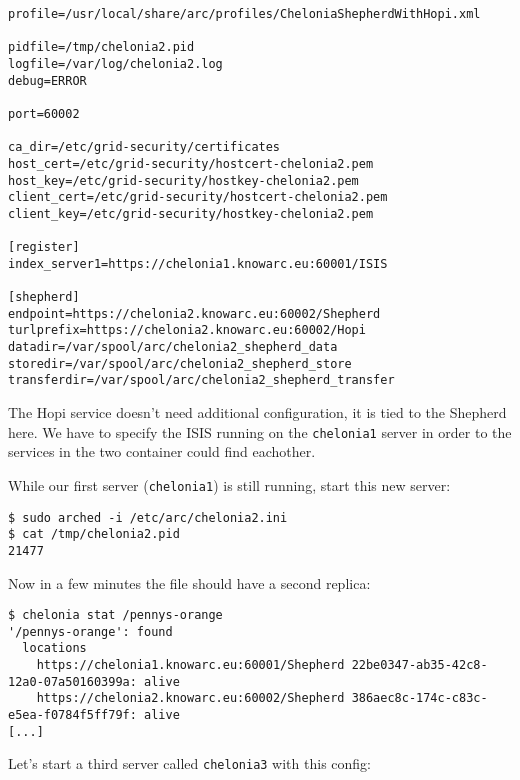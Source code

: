 \documentclass{article}
\begin{document}
\begin{verbatim}
profile=/usr/local/share/arc/profiles/CheloniaShepherdWithHopi.xml

pidfile=/tmp/chelonia2.pid
logfile=/var/log/chelonia2.log
debug=ERROR

port=60002

ca_dir=/etc/grid-security/certificates
host_cert=/etc/grid-security/hostcert-chelonia2.pem
host_key=/etc/grid-security/hostkey-chelonia2.pem
client_cert=/etc/grid-security/hostcert-chelonia2.pem
client_key=/etc/grid-security/hostkey-chelonia2.pem

[register]
index_server1=https://chelonia1.knowarc.eu:60001/ISIS

[shepherd]
endpoint=https://chelonia2.knowarc.eu:60002/Shepherd
turlprefix=https://chelonia2.knowarc.eu:60002/Hopi
datadir=/var/spool/arc/chelonia2_shepherd_data
storedir=/var/spool/arc/chelonia2_shepherd_store
transferdir=/var/spool/arc/chelonia2_shepherd_transfer
\end{verbatim}

The Hopi service doesn't need additional configuration, it is tied to the Shepherd here. We have to specify the ISIS running on the \verb!chelonia1! server in order to the services in the two container could find eachother.

While our first server (\verb!chelonia1!) is still running, start this new server:

\begin{verbatim}
$ sudo arched -i /etc/arc/chelonia2.ini
$ cat /tmp/chelonia2.pid
21477
\end{verbatim}

Now in a few minutes the file should have a second replica:

\begin{verbatim}
$ chelonia stat /pennys-orange
'/pennys-orange': found
  locations
    https://chelonia1.knowarc.eu:60001/Shepherd 22be0347-ab35-42c8-12a0-07a50160399a: alive
    https://chelonia2.knowarc.eu:60002/Shepherd 386aec8c-174c-c83c-e5ea-f0784f5ff79f: alive
[...]
\end{verbatim}

Let's start a third server called \verb!chelonia3! with this config:
\end{document}
